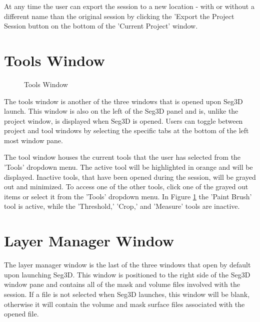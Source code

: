 \documentclass[fleqn,11pt,openany]{book}
\begin{document}
At any time the user can export the session to a new location - with or without a different name than the original session by clicking the 'Export the Project Session button on the bottom of the  'Current Project' window.

\section{Tools Window}
\begin{figure}[b]
\caption{Tools Window}\label{fig:ToolWindow}
\end{figure}
The tools window is another of the three windows that is opened upon Seg3D launch.  
This window is also on the left of the Seg3D panel and is, unlike the project window, is displayed when Seg3D is opened.  
Users can toggle between project and tool windows by selecting the specific tabs at the bottom of the left most window pane.

The tool window houses the current tools that the user has selected from the 'Tools' dropdown menu.  
The active tool will be highlighted in orange and will be displayed.  
Inactive tools, that have been opened during the session, will be grayed out and minimized.  
To access one of the other tools, click one of the grayed out items or select it from the 'Tools' dropdown menu.  
In Figure \ref{fig:ToolWindow} the 'Paint Brush' tool is active, while the 'Threshold,' 'Crop,' and 'Measure' tools are inactive.



\section{Layer Manager Window}
The layer manager window is the last of the three windows that open by default upon launching Seg3D.  
This window is positioned to the right side of the Seg3D window pane and contains all of the mask and volume files involved with the session.  
If a file is not selected when Seg3D launches, this window will be blank, otherwise it will contain the volume and mask surface files associated with the opened file.
\end{document}
